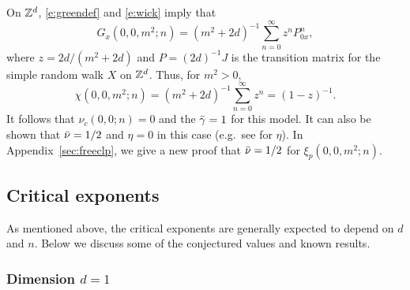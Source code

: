 \begin{example}
\label{ex:gff-asymp}
On ${ {{\mathbb Z}}^d }$, \eqref{e:greendef} and \eqref{e:wick} imply that
\begin{equation}
G_x(0, 0, m^2; n)
	=
(m^2 + 2 d)^{-1} \sum_{n=0}^\infty z^n P^n_{0x},
\end{equation}
where $z = 2 d / (m^2 + 2 d)$ and $P = (2 d)^{-1} J$
is the transition matrix for the simple random walk $X$ on ${ {{\mathbb Z}}^d }$.
Thus, for $m^2 > 0$,
\begin{equation}
\chi(0, 0, m^2; n)
  =
(m^2 + 2 d)^{-1} \sum_{n=0}^\infty z^n
  =
(1 - z)^{-1}.
\end{equation}
It follows that $\nu_c(0, 0; n) = 0$ and the $\bar\gamma = 1$ for this model.
It can also be shown that $\bar\nu = 1/2$ and $\eta = 0$ in this case
(e.g.\ see \cite{Lawl85} for $\eta$). In Appendix~\ref{sec:freeclp}, we give a new
proof that $\bar\nu = 1/2$ for $\xi_p(0, 0, m^2; n)$.
\end{example}


\subsection{Critical exponents}
\label{sec:dimension}

As mentioned above, the critical exponents are generally expected to depend on
$d$ and $n$. Below we discuss some of the conjectured values and known results.

\subsubsection{Dimension $d = 1$}


